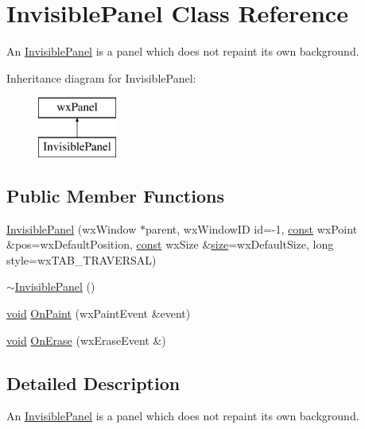\hypertarget{class_invisible_panel}{}\section{Invisible\+Panel Class Reference}
\label{class_invisible_panel}


An \hyperlink{class_invisible_panel}{Invisible\+Panel} is a panel which does not repaint its own background.  


Inheritance diagram for Invisible\+Panel\+:\begin{figure}[H]
\begin{center}
\leavevmode
\includegraphics[height=2.000000cm]{class_invisible_panel}
\end{center}
\end{figure}
\subsection*{Public Member Functions}
\begin{DoxyCompactItemize}
\item 
\hyperlink{class_invisible_panel_a56879a49516c47c1ce23010374882486}{Invisible\+Panel} (wx\+Window $\ast$parent, wx\+Window\+ID id=-\/1, \hyperlink{getopt1_8c_a2c212835823e3c54a8ab6d95c652660e}{const} wx\+Point \&pos=wx\+Default\+Position, \hyperlink{getopt1_8c_a2c212835823e3c54a8ab6d95c652660e}{const} wx\+Size \&\hyperlink{group__lavu__mem_ga854352f53b148adc24983a58a1866d66}{size}=wx\+Default\+Size, long style=wx\+T\+A\+B\+\_\+\+T\+R\+A\+V\+E\+R\+S\+AL)
\item 
\hyperlink{class_invisible_panel_afe11f0b13950314629fb59e2e8045f3a}{$\sim$\+Invisible\+Panel} ()
\item 
\hyperlink{sound_8c_ae35f5844602719cf66324f4de2a658b3}{void} \hyperlink{class_invisible_panel_a7f8b59a455b6c2f48d7e90755e503c37}{On\+Paint} (wx\+Paint\+Event \&event)
\item 
\hyperlink{sound_8c_ae35f5844602719cf66324f4de2a658b3}{void} \hyperlink{class_invisible_panel_aa8794a987462a0538dc8558e1610e61b}{On\+Erase} (wx\+Erase\+Event \&)
\end{DoxyCompactItemize}


\subsection{Detailed Description}
An \hyperlink{class_invisible_panel}{Invisible\+Panel} is a panel which does not repaint its own background. 

